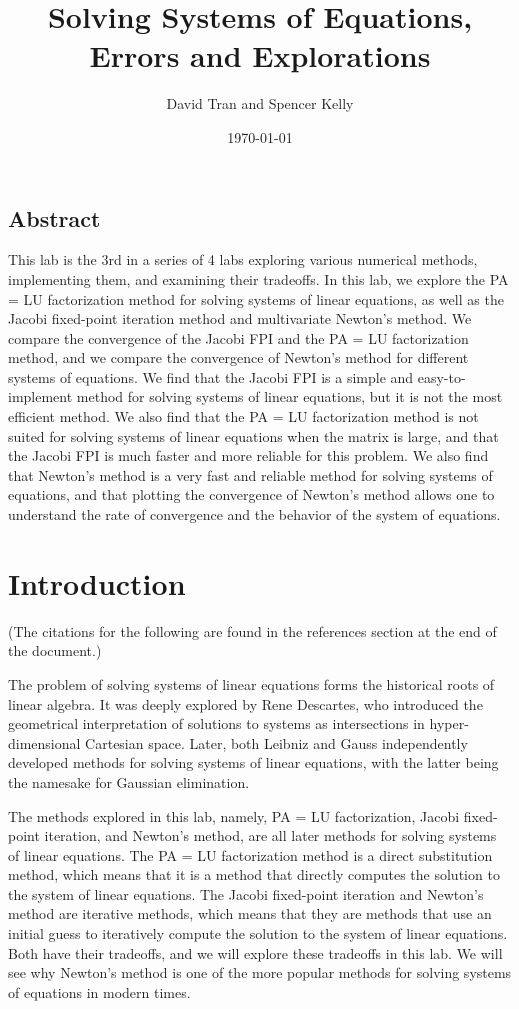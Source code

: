 \documentclass[11pt]{article}
\title{Solving Systems of Equations, Errors and Explorations}
\author{David Tran and Spencer Kelly}
\date{\today}
\begin{document}
\maketitle

\subsection*{Abstract}
This lab is the 3rd in a series of 4 labs exploring various numerical methods, implementing them, and examining their tradeoffs. In this lab, we explore the PA = LU factorization method for solving systems of linear equations, as well as the Jacobi fixed-point iteration method and multivariate Newton's method. We compare the convergence of the Jacobi FPI and the PA = LU factorization method, and we compare the convergence of Newton's method for different systems of equations. We find that the Jacobi FPI is a simple and easy-to-implement method for solving systems of linear equations, but it is not the most efficient method. We also find that the PA = LU factorization method is not suited for solving systems of linear equations when the matrix is large, and that the Jacobi FPI is much faster and more reliable for this problem. We also find that Newton's method is a very fast and reliable method for solving systems of equations, and that plotting the convergence of Newton's method allows one to understand the rate of convergence and the behavior of the system of equations.

\section{Introduction}

(The citations for the following are found in the references section at the end of the document.)

The problem of solving systems of linear equations forms the historical roots of linear algebra. It was deeply explored by Rene Descartes, who introduced the geometrical interpretation of solutions to systems as intersections in hyper-dimensional Cartesian space. Later, both Leibniz and Gauss independently developed methods for solving systems of linear equations, with the latter being the namesake for Gaussian elimination. 

The methods explored in this lab, namely, PA = LU factorization, Jacobi fixed-point iteration, and Newton's method, are all later methods for solving systems of linear equations. The PA = LU factorization method is a direct substitution method, which means that it is a method that directly computes the solution to the system of linear equations. The Jacobi fixed-point iteration and Newton's method are iterative methods, which means that they are methods that use an initial guess to iteratively compute the solution to the system of linear equations. Both have their tradeoffs, and we will explore these tradeoffs in this lab. We will see why Newton's method is one of the more popular methods for solving systems of equations in modern times.
\end{document}
